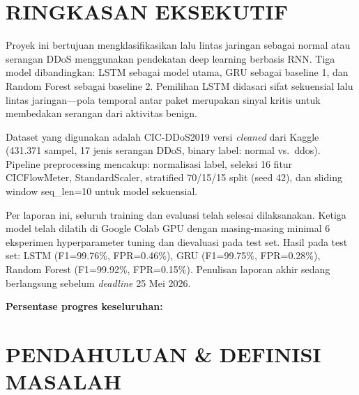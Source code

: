 \documentclass[11pt,a4paper,oneside]{report}
\begin{document}
\tableofcontents

\chapter*{RINGKASAN EKSEKUTIF}

Proyek ini bertujuan mengklasifikasikan lalu lintas jaringan sebagai normal atau serangan DDoS menggunakan pendekatan deep learning berbasis RNN. Tiga model dibandingkan: LSTM sebagai model utama, GRU sebagai baseline 1, dan Random Forest sebagai baseline 2. Pemilihan LSTM didasari sifat sekuensial lalu lintas jaringan---pola temporal antar paket merupakan sinyal kritis untuk membedakan serangan dari aktivitas benign.

Dataset yang digunakan adalah CIC-DDoS2019 versi \textit{cleaned} dari Kaggle (431.371 sampel, 17 jenis serangan DDoS, binary label: normal vs.\ ddos). Pipeline preprocessing mencakup: normalisasi label, seleksi 16 fitur CICFlowMeter, StandardScaler, stratified 70/15/15 split (seed 42), dan sliding window seq\_len=10 untuk model sekuensial.

Per laporan ini, seluruh training dan evaluasi telah selesai dilaksanakan. Ketiga model telah dilatih di Google Colab GPU dengan masing-masing minimal 6 eksperimen hyperparameter tuning dan dievaluasi pada test set. Hasil pada test set: LSTM (F1=99.76\%, FPR=0.46\%), GRU (F1=99.75\%, FPR=0.28\%), Random Forest (F1=99.92\%, FPR=0.15\%). Penulisan laporan akhir sedang berlangsung sebelum \textit{deadline} 25 Mei 2026.

\vspace{0.5em}
\noindent\textbf{Persentase progres keseluruhan:} 

\chapter{PENDAHULUAN \& DEFINISI MASALAH}
\label{bab:pendahuluan}
\end{document}
